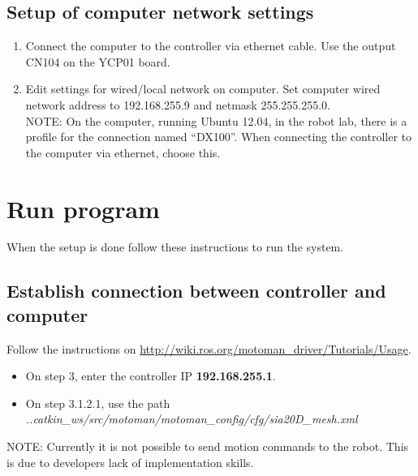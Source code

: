 \documentclass[10pt,a4paper]{article}
\begin{document}
\subsection{Setup of computer network settings}

\begin{enumerate}

\item Connect the computer to the controller via ethernet cable. Use the output CN104 on the YCP01 board.
\item Edit settings for wired/local network on computer. Set computer wired network address to 192.168.255.9 and netmask 255.255.255.0.\\


NOTE: On the computer, running Ubuntu 12.04, in the robot lab, there is a profile for the connection named “DX100”. When connecting the controller to the computer via ethernet, choose this.
\end{enumerate}

\section{Run program}
When the setup is done follow these instructions to run the system.
\subsection{Establish connection between controller and computer}
Follow the instructions on \url{http://wiki.ros.org/motoman\_driver/Tutorials/Usage}.
\begin{itemize}


\item On step 3, enter the controller IP \textbf{192.168.255.1}.

\item  On step 3.1.2.1, use the path \textit{..catkin\_ws/src/motoman/motoman\_config/cfg/sia20D\_mesh.xml}\\
\end{itemize}
NOTE: Currently it is not possible to send motion commands to the robot.
This is due to developers lack of implementation skills.
\end{document}
